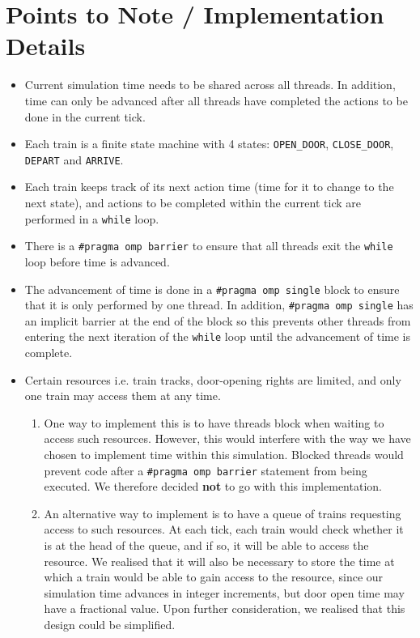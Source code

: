 \documentclass[a4paper,12pt]{article}
\begin{document}
	\section{Points to Note / Implementation Details}
	\begin{itemize}
		\item Current simulation time needs to be shared across all threads. In addition, time can only be advanced after all threads have completed the actions to be done in the current tick.
		\item Each train is a finite state machine with 4 states: \texttt{OPEN\_DOOR}, \texttt{CLOSE\_DOOR}, \texttt{DEPART} and \texttt{ARRIVE}.
		\item Each train keeps track of its next action time (time for it to change to the next state), and actions to be completed within the current tick are performed in a \texttt{while} loop.
		\item There is a \texttt{#pragma omp barrier} to ensure that all threads exit the \texttt{while} loop before time is advanced.
		\item The advancement of time is done in a \texttt{#pragma omp single} block to ensure that it is only performed by one thread. In addition, \texttt{#pragma omp single} has an implicit barrier at the end of the block so this prevents other threads from entering the next iteration of the \texttt{while} loop until the advancement of time is complete.
		\item Certain resources i.e. train tracks, door-opening rights are limited, and only one train may access them at any time.
		\begin{enumerate}
			\item One way to implement this is to have threads block when waiting to access such resources. However, this would interfere with the way we have chosen to implement time within this simulation. Blocked threads would prevent code after a \texttt{#pragma omp barrier} statement from being executed. We therefore decided \textbf{not} to go with this implementation.
			\item An alternative way to implement is to have a queue of trains requesting access to such resources. At each tick, each train would check whether it is at the head of the queue, and if so, it will be able to access the resource. We realised that it will also be necessary to store the time at which a train would be able to gain access to the resource, since our simulation time advances in integer increments, but door open time may have a fractional value. Upon further consideration, we realised that this design could be simplified.

\end{enumerate}
\end{itemize}
\end{document}
